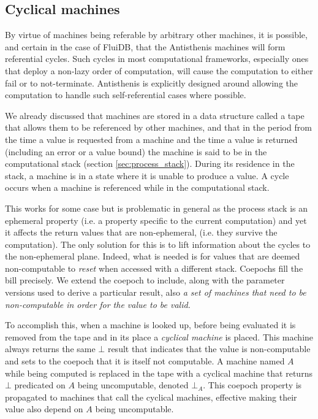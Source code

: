 \subsection{Cyclical machines}
\label{sec:cyclical_machines}

By virtue of machines being referable by arbitrary other machines, it
is possible, and certain in the case of FluiDB, that the Antisthenis
machines will form referential cycles. Such cycles in most
computational frameworks, especially ones that deploy a non-lazy order
of computation, will cause the computation to either fail or to
not-terminate. Antisthenis is explicitly designed around allowing the
computation to handle such self-referential cases where possible.

We already discussed that machines are stored in a
data structure called a tape that allows them to be referenced by
other machines, and that in the period from the time a value is
requested from a machine and the time a value is returned (including an
error or a value bound) the machine is said to be in the computational
stack (section \ref{sec:process_stack}). During its
residence in the stack, a machine is in a state where it is unable to
produce a value. A cycle occurs when a machine is referenced while in
the computational stack.

This works for some case but is problematic in general as the process
stack is an ephemeral property (i.e. a property specific to the
current computation) and yet it affects the return values that are
non-ephemeral, (i.e. they survive the computation).  The only solution
for this is to lift information about the cycles to the non-ephemeral
plane. Indeed, what is needed is for values that are deemed
non-computable to \emph{reset} when accessed with a different
stack. Coepochs fill the bill precisely. We extend the coepoch to
include, along with the parameter versions used to derive a particular
result, also \emph{a set of machines that need to be non-computable in
  order for the value to be valid.}

To accomplish this, when a machine is looked up, before being
evaluated it is removed from the tape and in its place a
\emph{cyclical machine} is placed. This machine always returns the
same \(\bot\) result that indicates that the value is non-computable
and sets to the coepoch that it is itself not computable. A machine
named \(A\) while being computed is replaced in the tape with a
cyclical machine that returns \(\bot\) predicated on \(A\) being
uncomputable, denoted \(\bot_A\). This coepoch property is propagated
to machines that call the cyclical machines, effective making their
value also depend on \(A\) being uncomputable.


